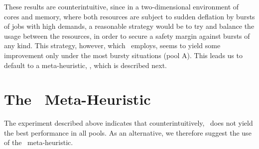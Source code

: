 These results are counterintuitive, since in a two-dimensional
environment of cores and memory, where both resources are subject to
sudden deflation by bursts of jobs with high demands, a reasonable
strategy would be to try and balance the usage between the resources,
in order to secure a safety margin against bursts of any kind.
This strategy, however, which \mif\ employs, seems to yield some
improvement only under the most bursty situations (pool A).
This leads us to default to a meta-heuristic, \maj, which is described
next.




\chapter{The \maj\ Meta-Heuristic}
\label{sec:max-jobs}

The experiment described above indicates that counterintuitively, 
\mif\ does not yield the best performance in all pools.
As an alternative, we therefore suggest the use of the \maj\ meta-heuristic.


